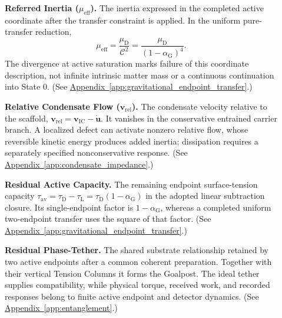 \begin{description}
\item[] \begin{minipage}[t]{\linewidth}
\textbf{Referred Inertia ($\mu_{\mathrm{eff}}$).} The inertia expressed in the completed active coordinate after the transfer constraint is applied. In the uniform pure-transfer reduction,
\[
 \mu_{\mathrm{eff}}=\frac{\mu_{\mathrm D}}{\mathcal C^2}
 =\frac{\mu_{\mathrm D}}{(1-\alpha_{\mathrm G})^4}.
\]
The divergence at active saturation marks failure of this coordinate description, not infinite intrinsic matter mass or a continuous continuation into State 0.
(See \hyperref[app:gravitational_endpoint_transfer]{Appendix~\ref*{app:gravitational_endpoint_transfer}}.)
\end{minipage}

\item[] \begin{minipage}[t]{\linewidth}
\textbf{Relative Condensate Flow ($\mathbf v_{\mathrm{rel}}$).} The condensate velocity relative to the scaffold, $\mathbf v_{\mathrm{rel}}=\mathbf v_{\mathrm{IC}}-\dot{\mathbf u}$. It vanishes in the conservative entrained carrier branch. A localized defect can activate nonzero relative flow, whose reversible kinetic energy produces added inertia; dissipation requires a separately specified nonconservative response.
(See \hyperref[app:condensate_impedance]{Appendix~\ref*{app:condensate_impedance}}.)
\end{minipage}

\item[] \begin{minipage}[t]{\linewidth}
\textbf{Residual Active Capacity.} The remaining endpoint surface-tension capacity $\tau_{\mathrm{av}}=\tau_{\mathrm D}-\tau_{\mathrm L}=\tau_{\mathrm D}(1-\alpha_{\mathrm G})$ in the adopted linear subtraction closure. Its single-endpoint factor is $1-\alpha_{\mathrm G}$, whereas a completed uniform two-endpoint transfer uses the square of that factor.
(See \hyperref[app:gravitational_endpoint_transfer]{Appendix~\ref*{app:gravitational_endpoint_transfer}}.)
\end{minipage}

\item[] \begin{minipage}[t]{\linewidth}
\textbf{Residual Phase-Tether.} The shared substrate relationship retained by two active endpoints after a common coherent preparation. Together with their vertical Tension Columns it forms the Goalpost. The ideal tether supplies compatibility, while physical torque, received work, and recorded responses belong to finite active endpoint and detector dynamics.
(See \hyperref[app:entanglement]{Appendix~\ref*{app:entanglement}}.)
\end{minipage}


\end{description}
